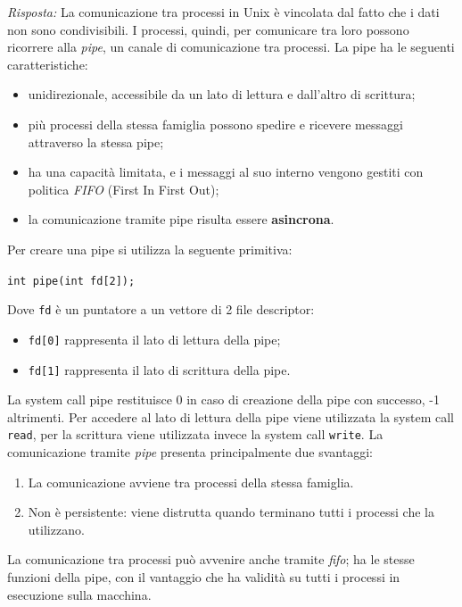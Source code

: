 \documentclass{article}
\newenvironment{solution}
    {\textit{Risposta:}}
    {}
\begin{document}
\begin{solution}
La comunicazione tra processi in Unix è vincolata dal fatto che i dati non sono condivisibili.
\newline
I processi, quindi, per comunicare tra loro possono ricorrere alla \textit{pipe}, un canale di comunicazione tra processi.
La pipe ha le seguenti caratteristiche:
\begin{itemize}
    \item unidirezionale, accessibile da un lato di lettura e dall’altro di scrittura;
    \item più processi della stessa famiglia possono spedire e ricevere messaggi attraverso la stessa pipe;
    \item ha una capacità limitata, e i messaggi al suo interno vengono gestiti con politica \textit{FIFO} (First In First Out);
    \item la comunicazione tramite pipe risulta essere \textbf{asincrona}.
\end{itemize}
Per creare una pipe si utilizza la seguente primitiva:
\begin{center}
\texttt{int pipe(int fd[2]);}  
\end{center}
Dove \texttt{fd} è un puntatore a un vettore di 2 file descriptor:
\begin{itemize}
    \item \texttt{fd[0]} rappresenta il lato di lettura della pipe;
    \item \texttt{fd[1]} rappresenta il lato di scrittura della pipe.
\end{itemize}
La system call pipe restituisce 0 in caso di creazione della pipe con successo, -1 altrimenti.
\newline
Per accedere al lato di lettura della pipe viene utilizzata la system call \texttt{read}, per la scrittura viene utilizzata invece la system call \texttt{write}.
\newline
La comunicazione tramite \textit{pipe} presenta principalmente due svantaggi:
\begin{enumerate}
    \item La comunicazione avviene tra processi della stessa famiglia.
    \item Non è persistente: viene distrutta quando terminano tutti i processi che la utilizzano.
\end{enumerate}
La comunicazione tra processi può avvenire anche tramite \textit{fifo}; ha le stesse funzioni della pipe, con il vantaggio che ha validità su tutti i processi in esecuzione sulla macchina.

\end{solution}
\end{document}
